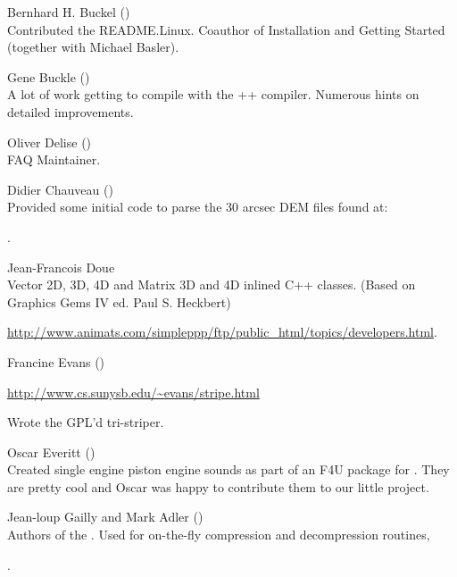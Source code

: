 \noindent Bernhard H. Buckel
()\\
  Contributed the README.Linux.  Coauthor of Installation
  and Getting Started (together with Michael Basler).
 \medskip

\noindent Gene Buckle ()\\
  A lot of work getting \FlightGear to compile with the ++
  compiler. Numerous hints on detailed improvements.
 \medskip

\noindent Oliver Delise  ()\\
 FAQ Maintainer.
\medskip

\noindent Didier Chauveau ()\\
  Provided some initial code to parse the 30 arcsec DEM files found at:

  .
 \medskip


\noindent Jean-Francois Doue\\
  Vector 2D, 3D, 4D and Matrix 3D and 4D inlined C++ classes.  (Based on
  Graphics Gems IV ed. Paul S. Heckbert)

\href{http://www.animats.com/simpleppp/ftp/public_html/topics/developers.html}{http://www.animats.com/simpleppp/ftp/public\_html/topics/developers.html}.
 \medskip

\noindent Francine Evans ()

\href{http://www.cs.sunysb.edu/~evans/stripe.html}{http://www.cs.sunysb.edu/\~{}evans/stripe.html}

  \noindent
  Wrote the GPL'd tri-striper.
 \medskip

\noindent Oscar Everitt ()\\
  Created single engine piston engine sounds as part of an F4U package
  for .  They are pretty cool and Oscar was happy to contribute
  them to our little project.
 \medskip

\noindent Jean-loup Gailly and Mark Adler
()\\
  Authors of the .  Used for on-the-fly compression and
  decompression routines,

  .
 \medskip

